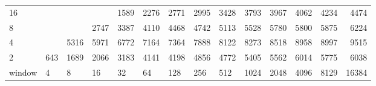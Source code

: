 \begin{table}[h]
{\begin{tabular}{lrrrrrrrrrrrrr}
			\multicolumn{1}{|l|}{16} &  &  &  & \cellcolor[HTML]{E69900}1589 & \cellcolor[HTML]{E69900}2276 & \cellcolor[HTML]{E60000}2771 & \cellcolor[HTML]{E60000}2995 & \cellcolor[HTML]{E60000}3428 & \cellcolor[HTML]{9900E6}3793 & \cellcolor[HTML]{9900E6}3967 & \cellcolor[HTML]{9900E6}4062 & \cellcolor[HTML]{9900E6}4234 & \cellcolor[HTML]{9900E6}4474 \\ \cline{1-1}
			\multicolumn{1}{|l|}{8} &  &  & \cellcolor[HTML]{E60000}2747 & \cellcolor[HTML]{E60000}3387 & \cellcolor[HTML]{9900E6}4110 & \cellcolor[HTML]{9900E6}4468 & \cellcolor[HTML]{9900E6}4742 & \cellcolor[HTML]{4C00E6}5113 & \cellcolor[HTML]{4C00E6}5528 & \cellcolor[HTML]{4C00E6}5780 & \cellcolor[HTML]{4C00E6}5800 & \cellcolor[HTML]{4C00E6}5875 & \cellcolor[HTML]{4C00E6}6224 \\ \cline{1-1}
			\multicolumn{1}{|l|}{4} &  & \cellcolor[HTML]{4C00E6}5316 & \cellcolor[HTML]{4C00E6}5971 & \cellcolor[HTML]{4C00E6}6772 & \cellcolor[HTML]{4C00E6}7164 & \cellcolor[HTML]{4C00E6}7364 & \cellcolor[HTML]{4C00E6}7888 & \cellcolor[HTML]{4C00E6}8122 & \cellcolor[HTML]{4C00E6}8273 & \cellcolor[HTML]{4C00E6}8518 & \cellcolor[HTML]{4C00E6}8958 & \cellcolor[HTML]{4C00E6}8997 & \cellcolor[HTML]{4C00E6}9515 \\ \cline{1-1}
			\multicolumn{1}{|l|}{2} & \cellcolor[HTML]{99E600}643 & \cellcolor[HTML]{E69900}1689 & \cellcolor[HTML]{E60000}2066 & \cellcolor[HTML]{E60000}3183 & \cellcolor[HTML]{9900E6}4141 & \cellcolor[HTML]{9900E6}4198 & \cellcolor[HTML]{9900E6}4856 & \cellcolor[HTML]{9900E6}4772 & \cellcolor[HTML]{4C00E6}5405 & \cellcolor[HTML]{4C00E6}5562 & \cellcolor[HTML]{4C00E6}6014 & \cellcolor[HTML]{4C00E6}5775 & \cellcolor[HTML]{4C00E6}6038 \\ \cline{1-1} \cline{11-14} 
			\multicolumn{1}{l|}{window} & \multicolumn{1}{l|}{4} & \multicolumn{1}{l|}{8} & \multicolumn{1}{l|}{16} & \multicolumn{1}{l|}{32} & \multicolumn{1}{l|}{64} & \multicolumn{1}{l|}{128} & \multicolumn{1}{l|}{256} & \multicolumn{1}{l|}{512} & \multicolumn{1}{l|}{1024} & \multicolumn{1}{l|}{2048} & \multicolumn{1}{l|}{4096} & \multicolumn{1}{l|}{8129} & \multicolumn{1}{l|}{16384} \\ \cline{2-14} 
		\end{tabular}
	}
\end{table}

